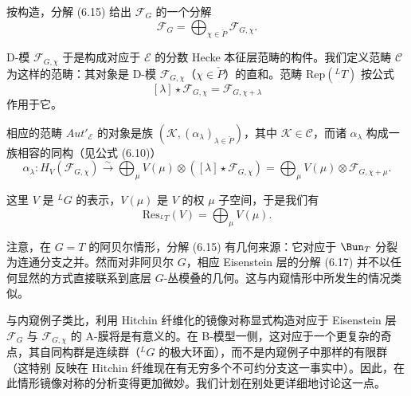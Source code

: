 按构造，分解 (6.15) 给出 $\mathcal{F}_G$ 的一个分解
\begin{equation}\tag{6.17}
\mathcal{F}_G = \bigoplus_{\chi\in\check{P}}\mathcal{F}_{G,\chi}.
\end{equation}

D-模 $\mathcal{F}_{G,\chi}$ 于是构成对应于 $\mathcal{E}$ 的分数 Hecke 本征层范畴的构件。我们定义范畴 $\mathcal{C}$ 为这样的范畴：其对象是 D-模 $\mathcal{F}_{G,\chi}$（$\chi\in\check{P}$）的直和。范畴 $\mathrm{Rep}({}^LT)$ 按公式
\[
[\lambda]\star\mathcal{F}_{G,\chi} = \mathcal{F}_{G,\chi+\lambda}
\]
作用于它。

相应的范畴 $Aut'_{\mathcal{E}}$ 的对象是族 $(\mathcal{K},(\alpha_\lambda)_{\lambda\in\check{P}})$，其中 $\mathcal{K}\in\mathcal{C}$，而诸 $\alpha_\lambda$ 构成一族相容的同构（见公式 (6.10)）
\[
\alpha_\lambda : H_V(\mathcal{F}_{G,\chi})\xrightarrow{\sim}\bigoplus_\mu V(\mu)\otimes([\lambda]\star\mathcal{F}_{G,\chi}) = \bigoplus_\mu V(\mu)\otimes\mathcal{F}_{G,\chi+\mu}.
\]


这里 $V$ 是 ${}^LG$ 的表示，$V(\mu)$ 是 $V$ 的权 $\mu$ 子空间，于是我们有
\[
\mathrm{Res}_{{}^LT}(V) = \bigoplus_\mu V(\mu).
\]

注意，在 $G = T$ 的阿贝尔情形，分解 (6.15) 有几何来源：它对应于 $\Bun_T$ 分裂为连通分支之并。然而对非阿贝尔 $G$，相应 Eisenstein 层的分解 (6.17) 并不以任何显然的方式直接联系到底层 $G$-丛模叠的几何。这与内窥情形中所发生的情况类似。

与内窥例子类比，利用 Hitchin 纤维化的镜像对称显式构造对应于 Eisenstein 层 $\mathcal{F}_G$ 与 $\mathcal{F}_{G,\chi}$ 的 A-膜将是有意义的。在 B-模型一侧，这对应于一个更复杂的奇点，其自同构群是连续群（${}^LG$ 的极大环面），而不是内窥例子中那样的有限群（这特别
反映在 Hitchin 纤维现在有无穷多个不可约分支这一事实中）。因此，在此情形镜像对称的分析变得更加微妙。我们计划在别处更详细地讨论这一点。

